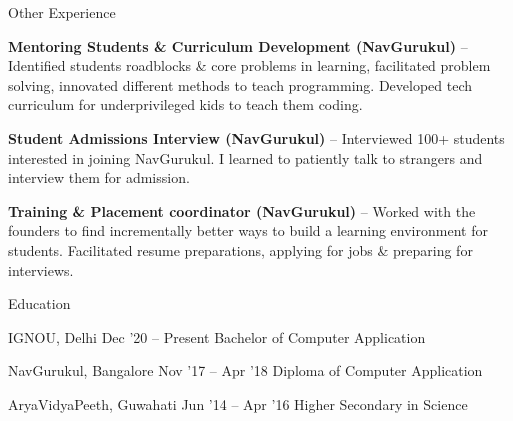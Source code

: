 \documentclass{resume} %
\begin{document}

\begin{rSection}{Other Experience}
  \begin{rProjectSection}
    \item \textbf {Mentoring Students \& Curriculum Development (NavGurukul)} -- Identified students roadblocks \& core problems in learning, facilitated problem solving, innovated different methods to teach programming. Developed tech curriculum for underprivileged kids to teach them coding.
    
    \item \textbf {Student Admissions Interview (NavGurukul)} -- Interviewed 100+ students interested in joining NavGurukul. I learned to patiently talk to strangers and interview them for admission.
    
    \item \textbf {Training \& Placement coordinator (NavGurukul)} -- Worked with the founders to find incrementally better ways to build a learning environment for students.
    Facilitated resume preparations, applying for jobs \& preparing for interviews.
  \end{rProjectSection}
\end{rSection}

\begin{rSection}{Education}
  \begin{rEducationSection}{IGNOU, Delhi}
                          {Dec '20 -- Present}
                          {Bachelor of Computer Application}
  \end{rEducationSection}
  \begin{rEducationSection}{NavGurukul, Bangalore}
                          {Nov '17 -- Apr '18 }
                          {Diploma of Computer Application}
  \end{rEducationSection}
  \begin{rEducationSection}{AryaVidyaPeeth, Guwahati}
                          {Jun '14 -- Apr '16 }
                          {Higher Secondary in Science}
  \end{rEducationSection}
\end{rSection}
\end{document}
